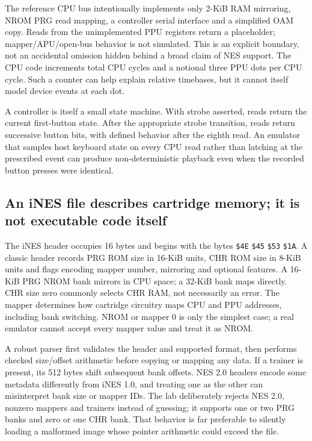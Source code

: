 The reference CPU bus intentionally implements only 2-KiB RAM mirroring, NROM PRG read mapping, a controller serial interface and a simplified OAM copy. Reads from the unimplemented PPU registers return a placeholder; mapper/APU/open-bus behavior is not simulated. This is an explicit boundary, not an accidental omission hidden behind a broad claim of NES support. The CPU code increments total CPU cycles and a notional three PPU dots per CPU cycle. Such a counter can help explain relative timebases, but it cannot itself model device events at each dot.

A controller is itself a small state machine. With strobe asserted, reads return the current first-button state. After the appropriate strobe transition, reads return successive button bits, with defined behavior after the eighth read. An emulator that samples host keyboard state on every CPU read rather than latching at the prescribed event can produce non-deterministic playback even when the recorded button presses were identical.

\subsection{An iNES file describes cartridge memory; it is not executable code itself}\label{01-foundations-i-ch016-an-ines-file-describes-cartridge-memory-it-is-not-executable-code-itself}

The iNES header occupies 16 bytes and begins with the bytes \texttt{\$4E} \texttt{\$45} \texttt{\$53} \texttt{\$1A}. A classic header records PRG ROM size in 16-KiB units, CHR ROM size in 8-KiB units and flags encoding mapper number, mirroring and optional features. A 16-KiB PRG NROM bank mirrors in CPU space; a 32-KiB bank maps directly. CHR size zero commonly selects CHR RAM, not necessarily an error. The mapper determines how cartridge circuitry maps CPU and PPU addresses, including bank switching. NROM or mapper 0 is only the simplest case; a real emulator cannot accept every mapper value and treat it as NROM.

A robust parser first validates the header and supported format, then performs checked size/offset arithmetic before copying or mapping any data. If a trainer is present, its 512 bytes shift subsequent bank offsets. NES 2.0 headers encode some metadata differently from iNES 1.0, and treating one as the other can misinterpret bank size or mapper IDs. The lab deliberately rejects NES 2.0, nonzero mappers and trainers instead of guessing; it supports one or two PRG banks and zero or one CHR bank. That behavior is far preferable to silently loading a malformed image whose pointer arithmetic could exceed the file.


